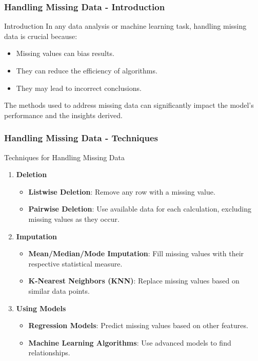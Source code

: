 \documentclass[aspectratio=169]{beamer}
\begin{document}
\begin{frame}[fragile]
    \frametitle{Handling Missing Data - Introduction}
    \begin{block}{Introduction}
        In any data analysis or machine learning task, handling missing data is crucial because:
        \begin{itemize}
            \item Missing values can bias results.
            \item They can reduce the efficiency of algorithms.
            \item They may lead to incorrect conclusions.
        \end{itemize}
        The methods used to address missing data can significantly impact the model's performance and the insights derived.
    \end{block}
\end{frame}

\begin{frame}[fragile]
    \frametitle{Handling Missing Data - Techniques}
    \begin{block}{Techniques for Handling Missing Data}
        \begin{enumerate}
            \item \textbf{Deletion}
                \begin{itemize}
                    \item \textbf{Listwise Deletion}: Remove any row with a missing value.
                    \item \textbf{Pairwise Deletion}: Use available data for each calculation, excluding missing values as they occur.
                \end{itemize}
            \item \textbf{Imputation}
                \begin{itemize}
                    \item \textbf{Mean/Median/Mode Imputation}: Fill missing values with their respective statistical measure.
                    \item \textbf{K-Nearest Neighbors (KNN)}: Replace missing values based on similar data points.
                \end{itemize}
            \item \textbf{Using Models}
                \begin{itemize}
                    \item \textbf{Regression Models}: Predict missing values based on other features.
                    \item \textbf{Machine Learning Algorithms}: Use advanced models to find relationships.
                \end{itemize}
        \end{enumerate}
    \end{block}
\end{frame}
\end{document}

